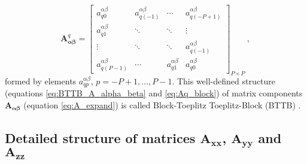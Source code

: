 \documentclass[manuscript]{geophysics}
\begin{document}
	\begin{equation}
		\mathbf{A}_{\boldsymbol{\alpha\beta}}^{q} = \begin{bmatrix}
			a^{\alpha\beta}_{q0}   & a^{\alpha\beta}_{q(-1)} & \cdots  & a^{\alpha\beta}_{q(-P+1)} \\
			a^{\alpha\beta}_{q1}   & \ddots     & \ddots  & \vdots       \\ 
			\vdots      & \ddots     & \ddots  & a^{\alpha\beta}_{q(-1)}   \\
			a^{\alpha\beta}_{q(P-1)} & \cdots     & a^{\alpha\beta}_{q1}  & a^{\alpha\beta}_{q0}
		\end{bmatrix}_{P \times P} \: ,
		\label{eq:Aq_block}
	\end{equation}
	formed by elements $a^{\alpha\beta}_{qp}$, $p = -P+1, \dots, P-1$.
	This well-defined structure (equations \ref{eq:BTTB_A_alpha_beta} and \ref{eq:Aq_block}) 
	of matrix components $\mathbf{A_{\boldsymbol{\alpha\beta}}}$ 
	(equation \ref{eq:A_expand}) is called Block-Toeplitz Toeplitz-Block (BTTB) 
	\citep[e.g., ][ p. 67]{chan-jin2007}.
	
	\subsection{Detailed structure of matrices $\mathbf{A_{xx}}$, $\mathbf{A_{yy}}$ and $\mathbf{A_{zz}}$}
	
\end{document}
